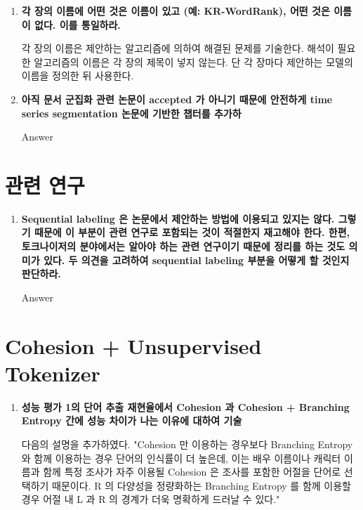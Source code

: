 \documentclass[11pt]{article}
\begin{document}
\begin{enumerate}
\item \textbf{각 장의 이름에 어떤 것은 이름이 있고 (예: KR-WordRank), 어떤 것은 이름이 없다. 이를 통일하라.}

각 장의 이름은 제안하는 알고리즘에 의하여 해결된 문제를 기술한다. 해석이 필요한 알고리즘의 이름은 각 장의 제목이 넣지 않는다. 단 각 장마다 제안하는 모델의 이름을 정의한 뒤 사용한다.

\item \textbf{아직 문서 군집화 관련 논문이 accepted 가 아니기 때문에 안전하게 time series segmentation 논문에 기반한 챕터를 추가하}

Answer


\end{enumerate}



\section{관련 연구}
\begin{enumerate}
\item \textbf{Sequential labeling 은 논문에서 제안하는 방법에 이용되고 있지는 않다. 그렇기 때문에 이 부분이 관련 연구로 포함되는 것이 적절한지 재고해야 한다. 한편, 토크나이저의 분야에서는 알아야 하는 관련 연구이기 때문에 정리를 하는 것도 의미가 있다. 두 의견을 고려하여 sequential labeling 부분을 어떻게 할 것인지 판단하라.}

Answer

\end{enumerate}



\section{Cohesion + Unsupervised Tokenizer}
\begin{enumerate}
\item \textbf{성능 평가 1의 단어 추출 재현율에서 Cohesion 과 Cohesion + Branching Entropy 간에 성능 차이가 나는 이유에 대하여 기술}

다음의 설명을 추가하였다.
"Cohesion 만 이용하는 경우보다 Branching Entropy 와 함께 이용하는 경우 단어의 인식률이 더 높은데, 이는 배우 이름이나 캐릭터 이름과 함께 특정 조사가 자주 이용될 Cohesion 은 조사를 포함한 어절을 단어로 선택하기 때문이다.
R 의 다양성을 정량화하는 Branching Entropy 를 함께 이용할 경우 어절 내 L 과 R 의 경계가 더욱 명확하게 드러날 수 있다."

\end{enumerate}
\end{document}
